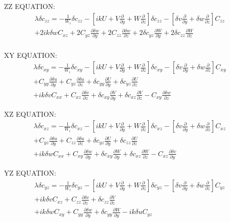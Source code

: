 \documentclass[12,a4paper]{article}
\newcommand{\dy}[1]{\frac{\partial #1}{\partial y}}
\newcommand{\dz}[1]{\frac{\partial #1}{\partial z}}
\newcommand{\scyy}{\delta c_{yy}}
\newcommand{\sczz}{\delta c_{zz}}
\newcommand{\scxy}{\delta c_{xy}}
\newcommand{\scxz}{\delta c_{xz}}
\newcommand{\scyz}{\delta c_{yz}}
\newcommand{\su}{\delta u}
\newcommand{\sv}{\delta v}
\newcommand{\sw}{\delta w}
\newcommand{\Wi}{\frac{1}{W_{i}}}
\newcommand{\first}[2]{-\Wi \delta c_{#1 #2} - \left[ ikU
+ V\frac{\partial}{\partial y} + W\frac{\partial}{\partial z} \right] \delta c_{#1 #2} 
- \left[ \sv\frac{\partial }{\partial y} + \sw\frac{\partial }{\partial z} \right] C_{#1 #2}}
\begin{document}
ZZ EQUATION:
\begin{multline}
 \lambda \delta c_{zz} = \first{z}{z} \\
+ 2ik\sw C_{xz} + 2C_{yz}\dy{\sw} + 2C_{zz}\dz{\sw} + 2\scyz \dy{W} + 2\sczz \dz{W}\\
\end{multline}

XY EQUATION:
\begin{multline}
  \lambda \delta c_{xy} = \first{x}{y} \\
 + C_{yy}\dy{\su} + C_{yz}\dz{\su} + \scyy \dy{U} + \scyz \dz{U} \\
 + ik\sv C_{xx} + C_{xz}\dz{\sv} + \scxy \dy{V} + \scxz \dz{V} - C_{xy}\dz{\sw}
\end{multline}

XZ EQUATION:
\begin{multline}
 \lambda \delta c_{xz} = \first{x}{z} \\
+ C_{yz}\dy{\su} + C_{zz}\dz{\su} + \scyz \dy{U} + \sczz \dz{U} \\
+ ik\sw C_{xx} + C_{xy}\dy{\sw} + \scxy \dy{W} + \scxz \dz{W} - C_{xz}\dy{\sv}
\end{multline}

YZ EQUATION:
\begin{multline}
 \lambda \delta c_{yz} = \first{y}{z} \\
+ ik\sv C_{xz} + C_{zz}\dz{\sv} + \sczz \dz{V} \\
+ ik\sw C_{xy} + C_{yy}\dy{\sw} + \scyy \dy{W} - ik\su C_{yz}
\end{multline}
\end{document}
